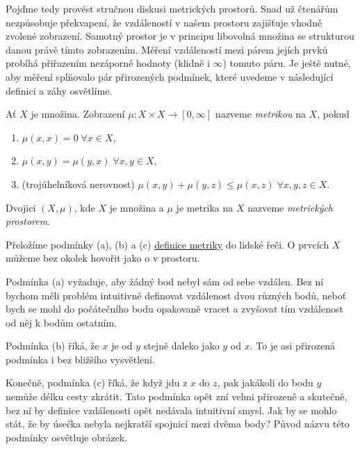 Pojďme tedy provést stručnou diskusi metrických prostorů. Snad už čtenářům
nezpůsobuje překvapení, že  vzdáleností v našem prostoru zajišťuje
vhodně zvolené zobrazení. Samotný prostor je v principu libovolná množina se
strukturou danou právě tímto zobrazením. Měření vzdáleností mezi párem jejích
prvků probíhá přiřazením nezáporné hodnoty (klidně i $\infty$) tomuto páru. Je
ještě nutné, aby měření splňovalo pár přirozených podmínek, které uvedeme v
následující definici a záhy osvětlíme.

\begin{definition}[Metrika]
 \label{def:metrika}
 Ať $X$ je množina. Zobrazení $\mu: X \times X \to [0,\infty]$ nazveme
 \emph{metrikou} na $X$, pokud
 \begin{enumerate}[label=(\alph*)]
  \item $\mu(x,x) = 0 \; \forall x \in X$,
  \item $\mu(x,y) = \mu(y,x) \; \forall x,y \in X$,
  \item (trojúhelníková nerovnost) $\mu(x,y) + \mu(y,z) \leq \mu(x,z) \;
   \forall x,y,z \in X$.
 \end{enumerate}
\end{definition}

\begin{definition}
 \label{def:metricky-prostor}
 Dvojici $(X,\mu)$, kde $X$ je množina a $\mu$ je metrika na $X$ nazveme
 \emph{metrických prostorem}.
\end{definition}

\begin{remark}
 Přeložíme podmínky (a), (b) a (c) \hyperref[def:metrika]{definice metriky} do
 lidské řeči. O prvcích $X$ můžeme bez okolek hovořit jako o  v
 prostoru.

 Podmínka (a) vyžaduje, aby žádný bod nebyl sám od sebe vzdálen. Bez ní bychom
 měli problém intuitivně definovat vzdálenost dvou různých bodů, neboť bych se
 mohl do počátečního bodu opakovaně vracet a zvyšovat tím vzdálenost od něj k
 bodům ostatním.

 Podmínka (b) říká, že $x$ je od $y$ stejně daleko jako $y$ od $x$. To je asi
 přirozená podmínka i bez bližšího vysvětlení.

 Konečně, podmínka (c) říká, že když jdu z $x$ do $z$, pak jakákoli
  do bodu $y$ nemůže délku cesty zkrátit. Tato podmínka opět zní
 velmi přirozeně a skutečně, bez ní by definice vzdálenosti opět nedávala
 intuitivní smysl. Jak by se mohlo stát, že by úsečka nebyla nejkratší spojnicí
 mezi dvěma body? Původ názvu  této podmínky
 osvětluje obrázek. %
\end{remark}
